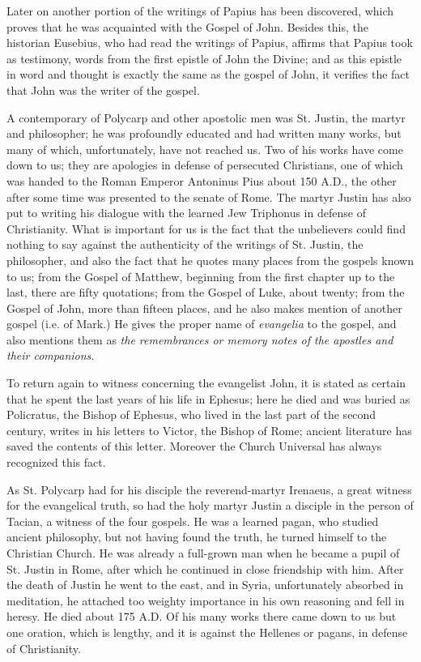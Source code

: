 Later on another portion of the writings of Papius has been discovered, which proves that he was acquainted with the Gospel of John. Besides this, the historian Eusebius, who had read  the writings of Papius, affirms that Papius took as testimony, words from the first epistle of John the Divine; and as this epistle in word and thought is exactly the same as the gospel of John, it verifies the fact that John was the writer of the gospel.

A contemporary of Polycarp and other apostolic men was St. Justin, the martyr and philosopher; he was profoundly educated and had written many works, but many of which, unfortunately, have not reached us. Two of his works have come down to us; they are apologies in defense of persecuted Christians, one of which was handed to the Roman Emperor Antoninus Pius about 150 A.D., the other after some time was presented to the senate of Rome. The martyr Justin has also put to writing his dialogue with the learned Jew Triphonus in defense of Christianity. What is important for us is the fact that the unbelievers could find nothing to say against the authenticity of the writings of St. Justin, the philosopher, and also the fact that he quotes many places from the gospels known to us; from the Gospel of Matthew, beginning from the first chapter up to the last, there are fifty quotations; from the Gospel of Luke, about twenty; from the Gospel of John, more than fifteen places, and he also makes mention of another gospel (i.e. of Mark.) He gives the proper name of \textit{evangelia} to the gospel, and also mentions them as \textit{the remembrances or memory notes of the apostles and their companions.}

To return again to witness concerning the evangelist John, it is stated as certain that he spent the last years of his life in Ephesus; here he died and was buried as Policratus, the Bishop of Ephesus, who lived in the last part of the second century, writes in his letters to Victor, the Bishop of Rome; ancient literature has saved the contents of this letter. Moreover the Church Universal has always recognized this fact.

As St. Polycarp had for his disciple the reverend-martyr Irenaeus, a great witness for the evangelical truth, so had the holy martyr Justin a disciple in the person of Tacian, a witness of the four gospels. He was a learned pagan, who studied ancient philosophy, but not having found the truth, he turned himself to the Christian Church. He was already a full-grown man when he became a pupil of St. Justin in Rome, after which he continued in close friendship with him. After the death of Justin he went to the east, and in Syria, unfortunately absorbed in meditation, he attached too weighty importance in his own reasoning and fell in heresy. He died about 175 A.D. Of his many works there came down to us but one oration, which is lengthy, and it is against the Hellenes or pagans, in defense of Christianity.


